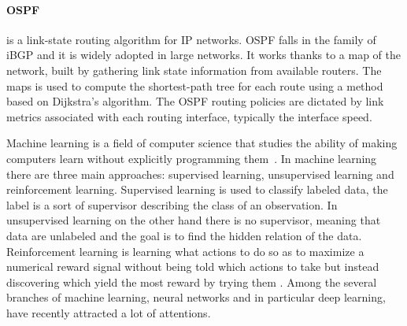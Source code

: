 \paragraph{OSPF} is a link-state routing algorithm for IP networks. OSPF falls in the family of iBGP and it is widely adopted in large networks. It works thanks to a map of the network, built by gathering link state information from available routers. The maps is used to compute the shortest-path tree for each route using a method based on Dijkstra's algorithm. The OSPF routing policies are dictated by link metrics associated with each routing interface, typically the interface speed.

Machine learning is a field of computer science that studies the ability of making computers learn without explicitly programming them~\cite{5392560}. In machine learning there are three main approaches: supervised learning, unsupervised learning and reinforcement learning. Supervised learning is used to classify labeled data, the label is a sort of supervisor describing the class of an observation. In unsupervised learning on the other hand there is no supervisor, meaning that data are unlabeled and the goal is to find the hidden relation of the data. Reinforcement learning is learning what actions to do so as to maximize a numerical reward signal without being told which actions to take but instead discovering which yield the most reward by trying them \cite{Sutton98reinforcementlearning}. Among the several branches of machine learning, neural networks and in particular deep learning, have recently attracted a lot of attentions.

